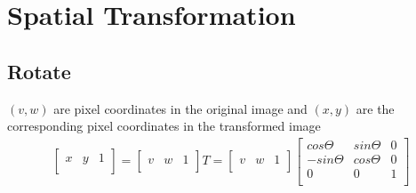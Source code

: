 \documentclass[11pt,oneside]{book}
\begin{document}
\section{Spatial Transformation}
\subsection{Rotate}
$(v, w)$ are pixel coordinates in the original image and $(x, y)$ are the corresponding pixel coordinates in the transformed image
\begin{align}
\left[               
  \begin{array}{ccc}  
    x & y & 1\\ 
  \end{array}
\right] 
=
\left[               
  \begin{array}{ccc}  
    v & w & 1\\ 
  \end{array}
\right]
T
=
\left[               
  \begin{array}{ccc}  
    v & w & 1\\ 
  \end{array}
\right]
\left[               
  \begin{array}{ccc}  
    cos\Theta & sin\Theta & 0\\
    -sin\Theta & cos\Theta & 0\\
    0 & 0 & 1\\ 
  \end{array}
\right]
\end{align}
\end{document}
